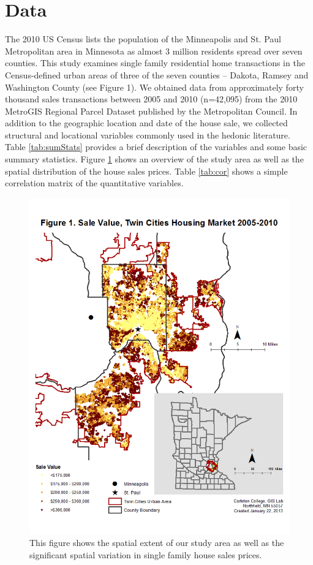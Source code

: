 \documentclass{article}\usepackage{graphicx, color}
\begin{document}
\section{Data}
The 2010 US Census lists the population of the Minneapolis and St. Paul Metropolitan area in Minnesota as almost 3 million residents spread over seven counties. This study examines single family residential home transactions in the Census-defined urban areas of three of the seven counties – Dakota, Ramsey and Washington County (see Figure 1). We obtained data from approximately forty thousand sales transactions between 2005 and 2010 (n=42,095) from the 2010 MetroGIS Regional Parcel Dataset published by the Metropolitan Council. In addition to the geographic location and date of the house sale, we collected structural and locational variables commonly used in the hedonic literature. Table \ref{tab:sumStats} provides a brief description of the variables and some basic summary statistics. Figure \ref{fig:overview} shows an overview of the study area as well as the spatial distribution of the house sales prices. Table \ref{tab:cor} shows a simple correlation matrix of the quantitative variables.

\begin{figure}
\includegraphics[width = \textwidth]{../graphs/StudyArea_SaleValueDistribution}
\caption{This figure shows the spatial extent of our study area as well as the significant spatial variation in single family house sales prices.}\label{fig:overview}
\end{figure}
\end{document}
